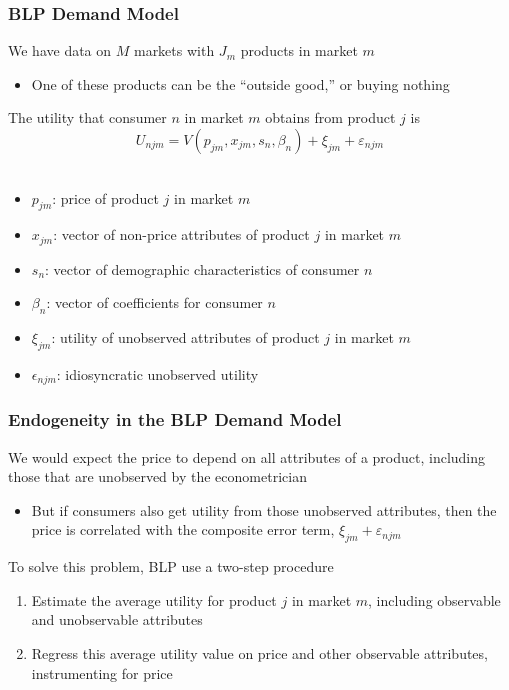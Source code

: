 \documentclass{beamer}
\begin{document}
\begin{frame}\frametitle{BLP Demand Model}
    We have data on $M$ markets with $J_m$ products in market $m$
    \begin{itemize}
        \item One of these products can be the ``outside good,'' or buying nothing
    \end{itemize}
    \vspace{2ex}
    The utility that consumer $n$ in market $m$ obtains from product $j$ is
    $$U_{njm} = V(p_{jm}, x_{jm}, s_n, \beta_n) + \xi_{jm} + \varepsilon_{njm}$$ \\
    \vspace{-1ex}
    \begin{itemize}
        \item $p_{jm}$: price of product $j$ in market $m$
        \item $x_{jm}$: vector of non-price attributes of product $j$ in market $m$
        \item $s_n$: vector of demographic characteristics of consumer $n$
        \item $\beta_n$: vector of coefficients for consumer $n$
        \item $\xi_{jm}$: utility of unobserved attributes of product $j$ in market $m$
        \item $\epsilon_{njm}$: idiosyncratic unobserved utility
    \end{itemize}
\end{frame}

\begin{frame}\frametitle{Endogeneity in the BLP Demand Model}
    We would expect the price to depend on all attributes of a product, including those that are unobserved by the econometrician
    \begin{itemize}
        \item But if consumers also get utility from those unobserved attributes, then the price is correlated with the composite error term, $\xi_{jm} + \varepsilon_{njm}$
    \end{itemize}
    \vspace{2ex}
    To solve this problem, BLP use a two-step procedure
    \begin{enumerate}
        \item Estimate the average utility for product $j$ in market $m$, including observable and unobservable attributes
        \item Regress this average utility value on price and other observable attributes, instrumenting for price 
    \end{enumerate}
\end{frame}
\end{document}
